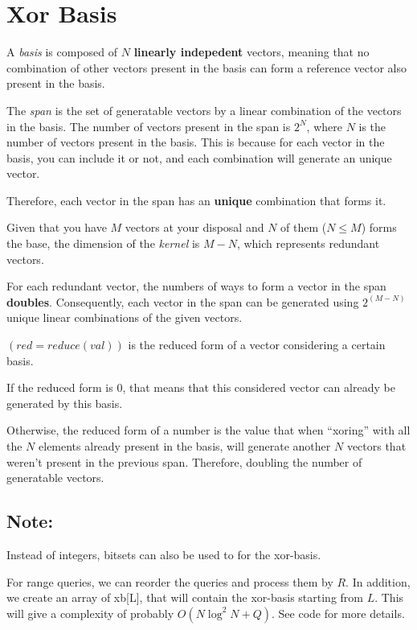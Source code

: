 \section{Xor Basis}

A \textit{basis} is composed of $N$ \textbf{linearly indepedent} vectors, 
meaning that no combination of other vectors present in the basis can form a reference vector also present in the basis.

The \textit{span} is the set of generatable vectors by a linear combination of the vectors in the basis.
The number of vectors present in the span is $2^N$, where $N$ is the number of vectors present in the basis.
This is because for each vector in the basis, you can include it or not, and each combination will generate an unique vector.

Therefore, each vector in the span has an \textbf{unique} combination that forms it. 

Given that you have $M$ vectors at your disposal and $N$ of them ($N \leq M$) forms the base,
the dimension of the \textit{kernel} is $M-N$, which represents redundant vectors.

For each redundant vector, the numbers of ways to form a vector in the span \textbf{doubles}.
Consequently, each vector in the span 
can be generated using $2^(M-N)$ unique linear combinations of the given vectors. 

$(red = reduce(val))$ is the reduced form of a vector considering a certain basis.

If the reduced form is $0$, that means that this considered vector can already be generated by this basis.

Otherwise, the reduced form of a number is the value that when ``xoring'' with all the $N$ elements 
already present in the basis, will generate another $N$ vectors that weren't present in the previous span.
Therefore, doubling the number of generatable vectors.

\subsection{Note:}

Instead of integers, bitsets can also be used to for the xor-basis.

For range queries, we can reorder the queries and process them by $R$. In addition, we create
an array of xb[L], that will contain the xor-basis starting from $L$. This will give a complexity
of probably $O(N \log^2{N} + Q)$. See code for more details.

